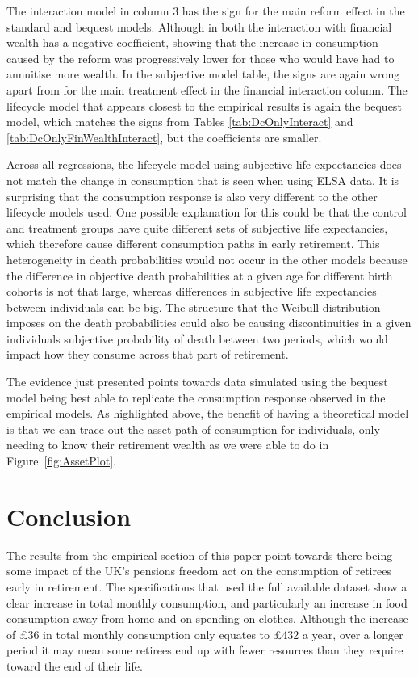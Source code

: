 \documentclass[12pt]{article}
\begin{document}
The interaction model in column 3 has the sign for the main
reform effect in the standard and bequest models. Although in both the
interaction with financial wealth has a negative coefficient, showing that the
increase in consumption caused by the reform was progressively lower for those
who would have had to annuitise more wealth. In the subjective model table, the
signs are again wrong apart from for the main treatment effect in the financial
interaction column. The lifecycle model that appears closest to the empirical
results is again the bequest model, which matches the signs from Tables
\ref{tab:DcOnlyInteract} and \ref{tab:DcOnlyFinWealthInteract}, but the
coefficients are smaller.

Across all regressions, the lifecycle model using subjective life expectancies
does not match the change in consumption that is seen when using ELSA data. It
is surprising that the consumption response is also very different to the other
lifecycle models used. One possible explanation for this could be that the
control and treatment groups have quite different sets of subjective life
expectancies, which therefore cause different consumption paths in early
retirement. This heterogeneity in death probabilities would not occur in the
other models because the difference in objective death probabilities at a given
age for different birth cohorts is not that large, whereas differences in
subjective life expectancies between individuals can be big. The structure that
the Weibull distribution imposes on the death probabilities could also be
causing discontinuities in a given individuals subjective probability of death
between two periods, which would impact how they consume across that part of
retirement.

The evidence just presented points towards data simulated using the bequest
model being best able to replicate the consumption response observed in the
empirical models. As highlighted above, the benefit of having a theoretical
model is that we can trace out the asset path of consumption for individuals,
only needing to know their retirement wealth as we were able to do in
Figure~\ref{fig:AssetPlot}.

\section{Conclusion}

The results from the empirical section of this paper point towards there being
some impact of the UK's pensions freedom act on the consumption of retirees
early in retirement. The specifications that used the full available dataset
show a clear increase in total monthly consumption, and particularly an increase
in food consumption away from home and on spending on clothes. Although the
increase of £36 in total monthly consumption only equates to £432 a year, over
a longer period it may mean some retirees end up with fewer resources than they
require toward the end of their life.
\end{document}
